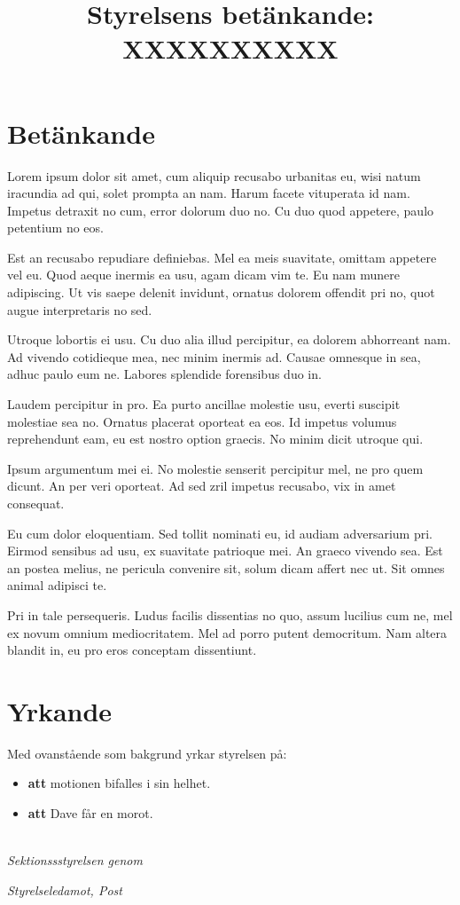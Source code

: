 \documentclass{dtek}
\title{Styrelsens betänkande: XXXXXXXXXX}
\begin{document}
\maketitle

\section*{Betänkande}
Lorem ipsum dolor sit amet, cum aliquip recusabo urbanitas eu, wisi natum iracundia ad qui, solet prompta an nam. Harum facete vituperata id nam. Impetus detraxit no cum, error dolorum duo no. Cu duo quod appetere, paulo petentium no eos.

 Est an recusabo repudiare definiebas. Mel ea meis suavitate, omittam appetere vel eu. Quod aeque inermis ea usu, agam dicam vim te. Eu nam munere adipiscing. Ut vis saepe delenit invidunt, ornatus dolorem offendit pri no, quot augue interpretaris no sed.

 Utroque lobortis ei usu. Cu duo alia illud percipitur, ea dolorem abhorreant nam. Ad vivendo cotidieque mea, nec minim inermis ad. Causae omnesque in sea, adhuc paulo eum ne. Labores splendide forensibus duo in.

 Laudem percipitur in pro. Ea purto ancillae molestie usu, everti suscipit molestiae sea no. Ornatus placerat oporteat ea eos. Id impetus volumus reprehendunt eam, eu est nostro option graecis. No minim dicit utroque qui.

 Ipsum argumentum mei ei. No molestie senserit percipitur mel, ne pro quem dicunt. An per veri oporteat. Ad sed zril impetus recusabo, vix in amet consequat.

 Eu cum dolor eloquentiam. Sed tollit nominati eu, id audiam adversarium pri. Eirmod sensibus ad usu, ex suavitate patrioque mei. An graeco vivendo sea. Est an postea melius, ne pericula convenire sit, solum dicam affert nec ut. Sit omnes animal adipisci te.

 Pri in tale persequeris. Ludus facilis dissentias no quo, assum lucilius cum ne, mel ex novum omnium mediocritatem. Mel ad porro putent democritum. Nam altera blandit in, eu pro eros conceptam dissentiunt.

\section*{Yrkande}
Med ovanstående som bakgrund yrkar styrelsen på:
\begin{itemize}
\item \textbf{att} motionen bifalles i sin helhet.
\item \textbf{att} Dave får en morot.
\end{itemize}

\ \\
\textit{Sektionssstyrelsen genom}

\textit{Styrelseledamot, Post}\\
\end{document}
